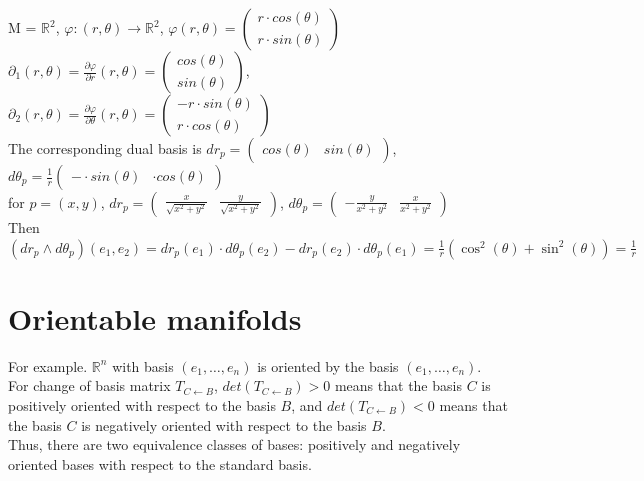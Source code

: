 \documentclass[11pt]{book} %
\begin{document}
\bigbreak

M = $\mathbb{R}^2$, $\varphi : (r, \theta) \to \mathbb{R}^2$, $\varphi(r, \theta) = \begin{pmatrix} r \cdot cos(\theta) \\ r \cdot sin(\theta) \end{pmatrix}$ \\
$\partial_1(r, \theta) = \frac{\partial \varphi }{\partial r}(r, \theta) = \begin{pmatrix} cos(\theta) \\  sin(\theta) \end{pmatrix}$, 
$\partial_2(r, \theta) = \frac{\partial  \varphi}{\partial \theta}(r, \theta) = \begin{pmatrix} -r \cdot sin(\theta) \\ r \cdot cos(\theta) \end{pmatrix}$ \\
The corresponding dual basis is $dr_p = \begin{pmatrix} cos(\theta) & sin(\theta) \end{pmatrix}$, $d\theta_p = \frac{1}{r} \begin{pmatrix} - \cdot sin(\theta) & \cdot cos(\theta) \end{pmatrix}$ \\
for $p = (x, y)$, $dr_p = \begin{pmatrix} \frac{x}{\sqrt{x^2 + y^2}} & \frac{y}{\sqrt{x^2 + y^2}} \end{pmatrix}$, $d\theta_p = \begin{pmatrix} - \frac{y}{x^2 + y^2} & \frac{x}{x^2 + y^2} \end{pmatrix}$ \\
Then $(dr_p \wedge d\theta_p) (e_1, e_2) = dr_p(e_1) \cdot d\theta_p(e_2) - dr_p(e_2) \cdot d\theta_p(e_1) = \frac{1}{r} (\cos^2(\theta) + \sin^2(\theta)) = \frac{1}{r}$


\section{Orientable manifolds}

For example. $\mathbb{R}^n$ with basis $(e_1, \ldots, e_n)$ is oriented by the basis $(e_1, \ldots, e_n)$. \\
For change of basis matrix $T_{C \leftarrow B}$, 
$det(T_{C \leftarrow B}) > 0$ means that the basis $C$ is positively oriented with respect to the basis $B$, 
and $det(T_{C \leftarrow B}) < 0$ means that the basis $C$ is negatively oriented with respect to the basis $B$. \\
\medbreak
Thus, there are two equivalence classes of bases: positively and negatively oriented bases with respect to the standard basis. \\
\end{document}
